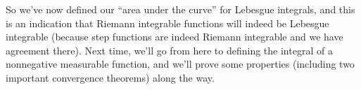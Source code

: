 So we've now defined our ``area under the curve'' for Lebesgue integrals, and this is an indication that Riemann integrable functions will indeed be Lebesgue integrable (because step functions are indeed Riemann integrable and we have agreement there). Next time, we'll go from here to defining the integral of a nonnegative measurable function, and we'll prove some properties (including two important convergence theorems) along the way.
